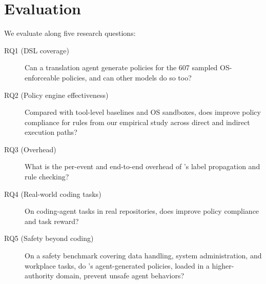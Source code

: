 \section{Evaluation}
\label{sec:evaluation}

We evaluate \sys{} along five research questions:

\begin{description}
\item[RQ1 (DSL coverage)] Can a translation agent generate \sys{} policies for the 607 sampled OS-enforceable policies, and can other models do so too?
\item[RQ2 (Policy engine effectiveness)] Compared with tool-level baselines and OS sandboxes, does \sys{} improve policy compliance for rules from our empirical study across direct and indirect execution paths?
\item[RQ3 (Overhead)] What is the per-event and end-to-end overhead of \sys{}'s label propagation and rule checking?
\item[RQ4 (Real-world coding tasks)] On coding-agent tasks in real repositories, does \sys{} improve policy compliance and task reward?
\item[RQ5 (Safety beyond coding)] On a safety benchmark covering data handling, system administration, and workplace tasks, do \sys{}'s agent-generated policies, loaded in a higher-authority domain, prevent unsafe agent behaviors?
\end{description}

